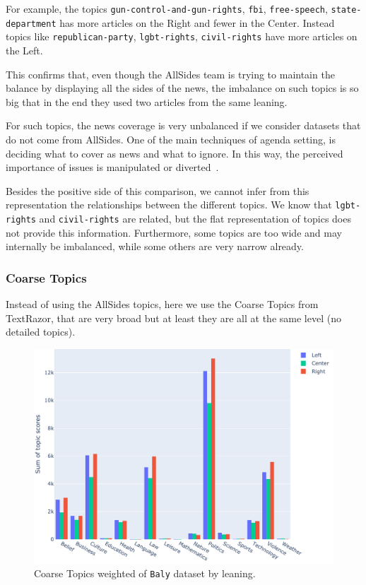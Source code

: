 For example, the topics \texttt{gun-control-and-gun-rights}, \texttt{fbi}, \texttt{free-speech}, \texttt{state-department} has more articles on the Right and fewer in the Center. Instead topics like \texttt{republican-party}, \texttt{lgbt-rights}, \texttt{civil-rights} have more articles on the Left.

This confirms that, even though the AllSides team is trying to maintain the balance by displaying all the sides of the news, the imbalance on such topics is so big that in the end they used two articles from the same leaning.

For such topics, the news coverage is very unbalanced if we consider datasets that do not come from AllSides.
One of the main techniques of agenda setting, is deciding what to cover as news and what to ignore. In this way, the perceived importance of issues is manipulated or diverted~\cite{mccombs1972agenda}.

Besides the positive side of this comparison, we cannot infer from this representation the relationships between the different topics.
We know that \texttt{lgbt-rights} and \texttt{civil-rights} are related, but the flat representation of topics does not provide this information.
Furthermore, some topics are too wide and may internally be imbalanced, while some others are very narrow already.

\subsubsection{\statusgreen Coarse Topics}

Instead of using the AllSides topics, here we use the Coarse Topics from TextRazor, that are very broad but at least they are all at the same level (no detailed topics).

\begin{figure}[!htbp]
    \centering
    \includegraphics[width=\linewidth]{figures/baly_coarse_weighted_by_leaning.pdf}
    \caption{Coarse Topics weighted of \texttt{Baly} dataset by leaning.}
    \label{fig:baly_coarse_weighted_by_leaning}
\end{figure}


